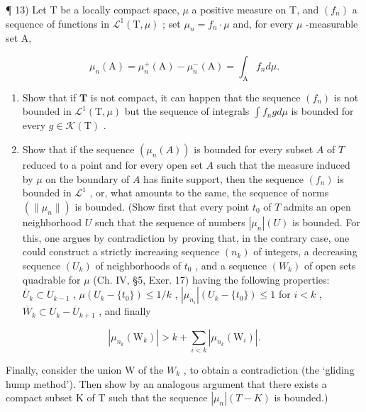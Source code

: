 ¶ 13) Let T be a locally compact space, \(\mu\) a positive measure on T, and \((f_n)\) a sequence of functions in \(\mathcal{L}^1(\mathrm{T},\mu)\) ; set \(\mu_n = f_n \cdot \mu\) and, for every \(\mu\) -measurable set A,

\[
\mu_ {n} (\mathrm{A}) = \mu_ {n} ^ {+} (\mathrm{A}) - \mu_ {n} ^ {-} (\mathrm{A}) = \int_ {\mathrm{A}} f _ {n} d \mu .
\]

\begin{enumerate}
\def\labelenumi{\alph{enumi})}
\item
  Show that if \(\mathbf{T}\) is not compact, it can happen that the sequence \((f_n)\) is not bounded in \(\mathcal{L}^1 (\mathrm{T},\mu)\) but the sequence of integrals \(\int f_n g d\mu\) is bounded for every \(g\in \mathcal{K}(\mathrm{T})\) .
\item
  Show that if the sequence \((\mu_n(A))\) is bounded for every subset \(A\) of \(T\) reduced to a point and for every open set \(A\) such that the measure induced by \(\mu\) on the boundary of \(A\) has finite support, then the sequence \((f_n)\) is bounded in \(\mathcal{L}^1\) , or, what amounts to the same, the sequence of norms \((\|\mu_n\|)\) is bounded. (Show first that every point \(t_0\) of \(T\) admits an open neighborhood \(U\) such that the sequence of numbers \(|\mu_n|(U)\) is bounded. For this, one argues by contradiction by proving that, in the contrary case, one could construct a strictly increasing sequence \((n_k)\) of integers, a decreasing sequence \((U_k)\) of neighborhoods of \(t_0\) , and a sequence \((W_k)\) of open sets quadrable for \(\mu\) (Ch. IV, §5, Exer. 17) having the following properties: \(\overline{U}_k \subset U_{k-1}\) , \(\mu(U_k - \{t_0\}) \leqslant 1/k\) , \(|\mu_{n_i}|(U_k - \{t_0\}) \leqslant 1\) for \(i < k\) , \(\overline{W}_k \subset U_k - \overline{U}_{k+1}\) , and finally
\end{enumerate}

\[
\left| \mu_ {n _ {k}} \left(\mathrm{W} _ {k}\right) \right| > k + \sum_ {i <   k} \left| \mu_ {n _ {k}} \left(\mathrm{W} _ {i}\right) \right|.
\]

Finally, consider the union W of the \(W_{k}\) , to obtain a contradiction (the `gliding hump method'). Then show by an analogous argument that there exists a compact subset K of T such that the sequence \(|\mu_{n}|(T - K)\) is bounded.)


